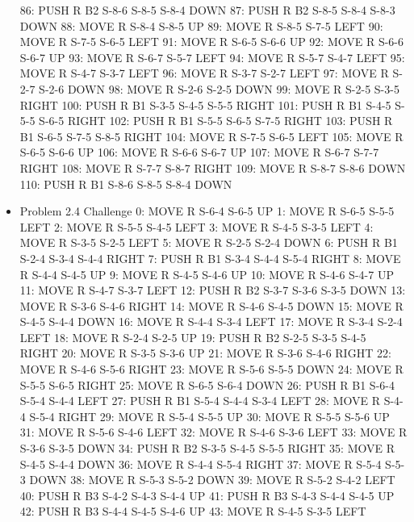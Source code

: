 \documentclass[12pt]{article}
\begin{document}
\begin{appendix}
\begin{itemize}
       86: PUSH R B2 S-8-6 S-8-5 S-8-4 DOWN
       87: PUSH R B2 S-8-5 S-8-4 S-8-3 DOWN
       88: MOVE R S-8-4 S-8-5 UP
       89: MOVE R S-8-5 S-7-5 LEFT
       90: MOVE R S-7-5 S-6-5 LEFT
       91: MOVE R S-6-5 S-6-6 UP
       92: MOVE R S-6-6 S-6-7 UP
       93: MOVE R S-6-7 S-5-7 LEFT
       94: MOVE R S-5-7 S-4-7 LEFT
       95: MOVE R S-4-7 S-3-7 LEFT
       96: MOVE R S-3-7 S-2-7 LEFT
       97: MOVE R S-2-7 S-2-6 DOWN
       98: MOVE R S-2-6 S-2-5 DOWN
       99: MOVE R S-2-5 S-3-5 RIGHT
      100: PUSH R B1 S-3-5 S-4-5 S-5-5 RIGHT
      101: PUSH R B1 S-4-5 S-5-5 S-6-5 RIGHT
      102: PUSH R B1 S-5-5 S-6-5 S-7-5 RIGHT
      103: PUSH R B1 S-6-5 S-7-5 S-8-5 RIGHT
      104: MOVE R S-7-5 S-6-5 LEFT
      105: MOVE R S-6-5 S-6-6 UP
      106: MOVE R S-6-6 S-6-7 UP
      107: MOVE R S-6-7 S-7-7 RIGHT
      108: MOVE R S-7-7 S-8-7 RIGHT
      109: MOVE R S-8-7 S-8-6 DOWN
      110: PUSH R B1 S-8-6 S-8-5 S-8-4 DOWN
    \item Problem 2.4 Challenge
     0: MOVE R S-6-4 S-6-5 UP
        1: MOVE R S-6-5 S-5-5 LEFT
        2: MOVE R S-5-5 S-4-5 LEFT
        3: MOVE R S-4-5 S-3-5 LEFT
        4: MOVE R S-3-5 S-2-5 LEFT
        5: MOVE R S-2-5 S-2-4 DOWN
        6: PUSH R B1 S-2-4 S-3-4 S-4-4 RIGHT
        7: PUSH R B1 S-3-4 S-4-4 S-5-4 RIGHT
        8: MOVE R S-4-4 S-4-5 UP
        9: MOVE R S-4-5 S-4-6 UP
       10: MOVE R S-4-6 S-4-7 UP
       11: MOVE R S-4-7 S-3-7 LEFT
       12: PUSH R B2 S-3-7 S-3-6 S-3-5 DOWN
       13: MOVE R S-3-6 S-4-6 RIGHT
       14: MOVE R S-4-6 S-4-5 DOWN
       15: MOVE R S-4-5 S-4-4 DOWN
       16: MOVE R S-4-4 S-3-4 LEFT
       17: MOVE R S-3-4 S-2-4 LEFT
       18: MOVE R S-2-4 S-2-5 UP
       19: PUSH R B2 S-2-5 S-3-5 S-4-5 RIGHT
       20: MOVE R S-3-5 S-3-6 UP
       21: MOVE R S-3-6 S-4-6 RIGHT
       22: MOVE R S-4-6 S-5-6 RIGHT
       23: MOVE R S-5-6 S-5-5 DOWN
       24: MOVE R S-5-5 S-6-5 RIGHT
       25: MOVE R S-6-5 S-6-4 DOWN
       26: PUSH R B1 S-6-4 S-5-4 S-4-4 LEFT
       27: PUSH R B1 S-5-4 S-4-4 S-3-4 LEFT
       28: MOVE R S-4-4 S-5-4 RIGHT
       29: MOVE R S-5-4 S-5-5 UP
       30: MOVE R S-5-5 S-5-6 UP
       31: MOVE R S-5-6 S-4-6 LEFT
       32: MOVE R S-4-6 S-3-6 LEFT
       33: MOVE R S-3-6 S-3-5 DOWN
       34: PUSH R B2 S-3-5 S-4-5 S-5-5 RIGHT
       35: MOVE R S-4-5 S-4-4 DOWN
       36: MOVE R S-4-4 S-5-4 RIGHT
       37: MOVE R S-5-4 S-5-3 DOWN
       38: MOVE R S-5-3 S-5-2 DOWN
       39: MOVE R S-5-2 S-4-2 LEFT
       40: PUSH R B3 S-4-2 S-4-3 S-4-4 UP
       41: PUSH R B3 S-4-3 S-4-4 S-4-5 UP
       42: PUSH R B3 S-4-4 S-4-5 S-4-6 UP
       43: MOVE R S-4-5 S-3-5 LEFT

\end{itemize}
\end{appendix}
\end{document}
